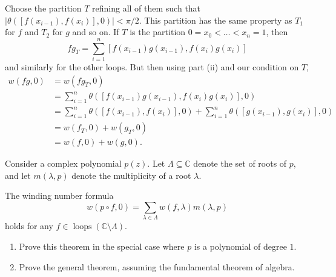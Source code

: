 \documentclass[12 pt, letterpaper]{hmcpset}
\begin{document}
\begin{solution}
\begin{enumerate}
			Choose the partition $T$ refining all of them such that $\lvert \theta([f(x_{i - 1}), f(x_{i})], 0) \rvert < \pi / 2$. This partition has the same property as $T_{1}$ for $f$ and $T_{2}$ for $g$ and so on. If $T$ is the partition $0 = x_{0} < \dots < x_{n} = 1$, then
			\[
				fg_{T} = \sum_{i = 1}^{n} [f(x_{i - 1}) g(x_{i - 1}), f(x_{i}) g(x_{i})]
			\]
			and similarly for the other loops. But then using part (ii) and our condition on $T$,
			\begin{align*}
				w(fg, 0) & = w(fg_{T}, 0) \\
					 & = \sum_{i = 1}^{n} \theta([f(x_{i - 1}) g(x_{i - 1}), f(x_{i}) g(x_{i})], 0) \\
					 & = \sum_{i = 1}^{n} \theta([f(x_{i - 1}), f(x_{i})], 0) + \sum_{i = 1}^{n} \theta([g(x_{i - 1}), g(x_{i})], 0) \\
					 & = w(f_{T}, 0) + w(g_{T}, 0) \\
					 & = w(f, 0) + w(g, 0).
			\end{align*}
	\end{enumerate}
\end{solution}

\pagebreak

\begin{problem}[31.]
	Consider a complex polynomial $p(z)$. Let $\Lambda \subseteq \mathbb{C}$ denote the set of roots of $p$, and let $m(\lambda, p)$ denote the multiplicity of a root $\lambda$.

	\begin{theorem}
		The winding number formula
		\[
			w(p \circ f, 0) = \sum_{\lambda \in \Lambda} w(f, \lambda) m(\lambda, p)
		\]
		holds for any $f \in \operatorname{loops}(\mathbb{C} \setminus \Lambda)$.
	\end{theorem}

	\begin{enumerate}
		\item Prove this theorem in the special case where $p$ is a polynomial of degree $1$.
		\item Prove the general theorem, assuming the fundamental theorem of algebra.
	\end{enumerate}	
\end{problem}
\end{document}
